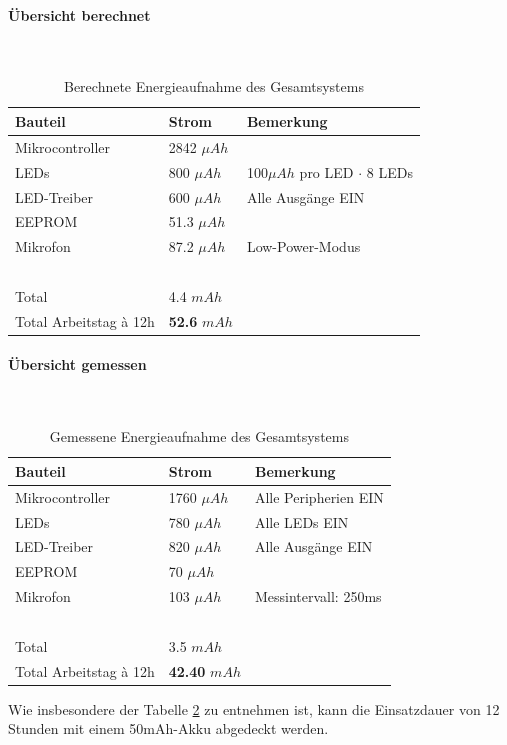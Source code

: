 \documentclass[12pt]{article}
\begin{document}
	\paragraph{Übersicht berechnet}\mbox{}\\
		\begin{table}[H] 
			\vspace*{-0.5cm}
			\centering
			\begin{tabular}{|l|l|l|}
			\hline
			\textbf{Bauteil} & \textbf{Strom} & \textbf{Bemerkung} \\ \hline
			Mikrocontroller & 2842 $\mu Ah$ & ~ \\ \hline
			LEDs & 800 $\mu Ah$ & 100$\mu Ah$ pro LED $\cdot$ 8 LEDs \\ \hline
			LED-Treiber & 600 $\mu Ah$ & Alle Ausgänge EIN \\ \hline
			EEPROM & 51.3 $\mu Ah$ & ~ \\ \hline
			Mikrofon & 87.2 $\mu Ah$ & Low-Power-Modus \\ \hline
			~ & ~ & ~ \\ \hline
			Total & 4.4 $mAh$ & ~ \\ \hline
			Total Arbeitstag à 12h & \textbf{52.6} $mAh$ & ~ \\ \hline
		\end{tabular}
		\caption{Berechnete Energieaufnahme des Gesamtsystems}
		\label{tab:leistung-berechnet}
	\end{table}
	\paragraph{Übersicht gemessen}\mbox{}\\
		\begin{table}[H] 
			\vspace*{-0.5cm}
			\centering
			\begin{tabular}{|l|l|l|}
			\hline
			\textbf{Bauteil} & \textbf{Strom} & \textbf{Bemerkung} \\ \hline
			Mikrocontroller & 1760 $\mu Ah$ & Alle Peripherien EIN \\ \hline
			LEDs & 780 $\mu Ah$ & Alle LEDs EIN\\ \hline
			LED-Treiber & 820 $\mu Ah$ & Alle Ausgänge EIN \\ \hline
			EEPROM & 70 $\mu Ah$ & ~ \\ \hline
			Mikrofon & 103 $\mu Ah$ & Messintervall: 250ms \\ \hline
			~ & ~ & ~ \\ \hline
			Total & 3.5 $mAh$ & ~ \\ \hline
			Total Arbeitstag à 12h & \textbf{42.40} $mAh$ & ~ \\ \hline
		\end{tabular}
		\caption{Gemessene Energieaufnahme des Gesamtsystems}
		\label{tab:leistung-gemessen}
		\end{table}
	\noindent Wie insbesondere der Tabelle \ref{tab:leistung-gemessen} zu entnehmen ist, kann die Einsatzdauer von 12 Stunden mit einem 50mAh-Akku abgedeckt werden.
\end{document}

